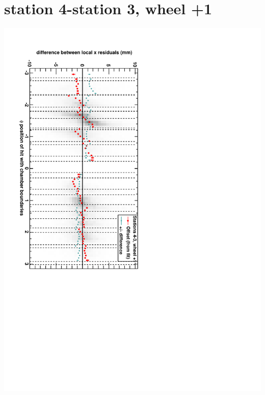 \documentclass[compress]{beamer}
\begin{document}
\section*{station 4-station 3, wheel +1}
\begin{frame} \vfill \mbox{\hspace{-1 cm}\includegraphics[height=1.2\linewidth, angle=90]{DTrphidiff34VsPhi_whD_slope.pdf}} \end{frame}
\end{document}
